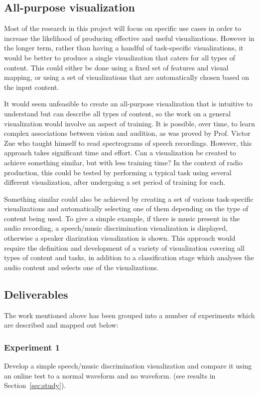 \subsection{All-purpose visualization}\label{sec:planall}
Most of the research in this project will focus on specific use cases in order
to increase the likelihood of producing effective and useful visualizations.
However in the longer term, rather than having a handful of task-specific
visualizations, it would be better to produce a single visualization that
caters for all types of content. This could either be done using a fixed set of
features and visual mapping, or using a set of visualizations that are
automatically chosen based on the input content.

It would seem unfeasible to create an all-purpose visualization that is
intuitive to understand but can describe all types of content, so the work on a
general visualization would involve an aspect of training.  It is possible,
over time, to learn complex associations between vision and audition, as was
proved by Prof. Victor Zue \cite{Zue1986} who taught himself to read
spectrograms of speech recordings. However, this approach takes significant
time and effort.  Can a visualization be created to achieve something similar,
but with less training time? In the context of radio production, this could be
tested by performing a typical task using several different visualization,
after undergoing a set period of training for each.

Something similar could also be achieved by creating a set of various
task-specific visualizations and automatically selecting one of them depending
on the type of content being used. To give a simple example, if there is music
present in the audio recording, a speech/music discrimination visualization is
displayed, otherwise a speaker diarization visualization is shown. This
approach would require the definition and development of a variety of
visualization covering all types of content and tasks, in addition to a
classification stage which analyses the audio content and selects one of the
visualizations.

\subsection{Deliverables}\label{sec:plandeliver}
The work mentioned above has been grouped into a number of experiments which
are described and mapped out below:

\subsubsection{Experiment 1}
Develop a simple speech/music discrimination visualization and compare it using
an online test to a normal waveform and no waveform. (see results in
Section~\ref{sec:study}).

